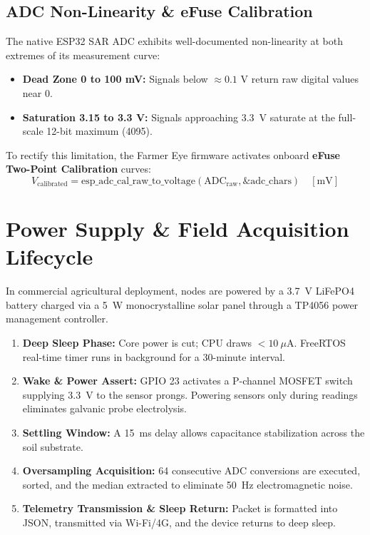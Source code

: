 \documentclass[11pt,a4paper,oneside]{report}
\begin{document}
\subsection{ADC Non-Linearity \& eFuse Calibration}
The native ESP32 SAR ADC exhibits well-documented non-linearity at both extremes of its measurement curve:
\begin{itemize}[leftmargin=*]
    \item \textbf{Dead Zone 0 to 100 mV:} Signals below $\approx 0.1\text{ V}$ return raw digital values near 0.
    \item \textbf{Saturation 3.15 to 3.3 V:} Signals approaching 3.3~V saturate at the full-scale 12-bit maximum (4095).
\end{itemize}
To rectify this limitation, the Farmer Eye firmware activates onboard \textbf{eFuse Two-Point Calibration} curves:
\begin{equation}
V_{\text{calibrated}} = \text{esp\_adc\_cal\_raw\_to\_voltage}(\text{ADC}_{\text{raw}}, \&\text{adc\_chars}) \quad [\text{mV}]
\end{equation}

\section{Power Supply \& Field Acquisition Lifecycle}
In commercial agricultural deployment, nodes are powered by a 3.7~V LiFePO4 battery charged via a 5~W monocrystalline solar panel through a TP4056 power management controller. 
\begin{enumerate}
    \item \textbf{Deep Sleep Phase:} Core power is cut; CPU draws $< 10\ \mu\text{A}$. FreeRTOS real-time timer runs in background for a 30-minute interval.
    \item \textbf{Wake \& Power Assert:} GPIO 23 activates a P-channel MOSFET switch supplying 3.3~V to the sensor prongs. Powering sensors only during readings eliminates galvanic probe electrolysis.
    \item \textbf{Settling Window:} A 15~ms delay allows capacitance stabilization across the soil substrate.
    \item \textbf{Oversampling Acquisition:} 64 consecutive ADC conversions are executed, sorted, and the median extracted to eliminate 50~Hz electromagnetic noise.
    \item \textbf{Telemetry Transmission \& Sleep Return:} Packet is formatted into JSON, transmitted via Wi-Fi/4G, and the device returns to deep sleep.
\end{enumerate}
\end{document}
